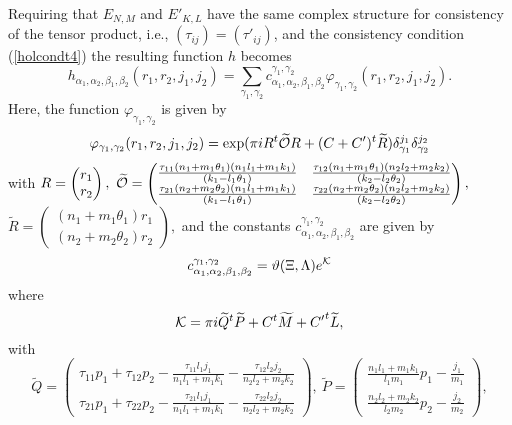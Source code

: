 \documentclass[12pt, a4paper]{article}
\begin{document}
Requiring that $E_{N,M}$ and $ E'_{K,L}$ have the same complex
structure for consistency of the tensor product, i.e.,
$(\tau_{ij}) = (\tau'_{ij})$, and the consistency condition
(\ref{holcondt4}) the resulting function $h$ becomes
\begin{equation}
h_{\alpha_1, \alpha_2, \beta_1, \beta_2} (r_1,r_2,j_1,j_2) =
\sum_{\gamma_1, \gamma_2} c_{\alpha_1, \alpha_2, \beta_1,
\beta_2}^{\gamma_1, \gamma_2} \varphi_{\gamma_1, \gamma_2}
(r_1,r_2,j_1,j_2).
\end{equation}
Here, the function $\varphi_{\gamma_1,\gamma_2} $ is given by
\[
 \varphi_{\gamma_1,\gamma_2} (r_1,r_2,j_1,j_2)  =
  \exp ( \pi i R^t \widetilde{\cal O}R + (C + C')^t \widetilde{R}
) \delta_{\gamma_1}^{j_1} \delta_{\gamma_2}^{j_2} \]
 with $ R=  \begin{pmatrix} r_1 \\ r_2 \end{pmatrix}, \
\widetilde{\cal O} =
\begin{pmatrix} \frac{\tau_{11}(n_1 +m_1 \theta_1)(n_1l_1
+m_1k_1)}{(k_1 -l_1 \theta_1)} & \frac{\tau_{12}(n_1 +m_1
\theta_1)(n_2l_2 +m_2k_2)}{(k_2 -l_2 \theta_2)}
  \\
  \frac{\tau_{21}(n_2 +m_2 \theta_2)(n_1l_1
+m_1k_1)}{(k_1 -l_1 \theta_1)} &
 \frac{\tau_{22}(n_2 +m_2
\theta_2)(n_2l_2 +m_2k_2)}{(k_2 -l_2 \theta_2)}
\end{pmatrix} , $
 $
\widetilde{R} = \begin{pmatrix} (n_1 +m_1 \theta_1)r_1   \\
 (n_2 +m_2 \theta_2)r_2
\end{pmatrix} , $ and the constants
$ c_{\alpha_1, \alpha_2, \beta_1, \beta_2}^{\gamma_1, \gamma_2}$
are given by
\[
 c_{\alpha_1, \alpha_2, \beta_1, \beta_2}^{\gamma_1,
\gamma_2}  = \vartheta (\Xi, \Lambda ) e^{\cal K}  \] where
%
%
\[ {\cal K}= \pi i {\widetilde{Q}}^t \widetilde{P} + C^t \widetilde{M}  + {C'}^t \widetilde{L}  , \]
with
\[ \widetilde{Q} = \begin{pmatrix} \tau_{11} p_1 + \tau_{12} p_2
   - \frac{\tau_{11}  l_1 j_1} {n_1l_1 +m_1k_1}
    - \frac{\tau_{12}  l_2 j_2} {n_2l_2 +m_2k_2} \\
\tau_{21} p_1 + \tau_{22} p_2
   - \frac{\tau_{21}  l_1 j_1} {n_1l_1 +m_1k_1}
    - \frac{\tau_{22}  l_2 j_2} {n_2l_2 +m_2k_2}
\end{pmatrix} , \
    \widetilde{P} = \begin{pmatrix} \frac{n_1l_1 +m_1k_1}{l_1m_1} p_1
     -\frac{j_1}{m_1} \\
    \frac{n_2l_2 +m_2k_2}{l_2m_2} p_2
     -\frac{j_2}{m_2}
\end{pmatrix} , \]
\end{document}
